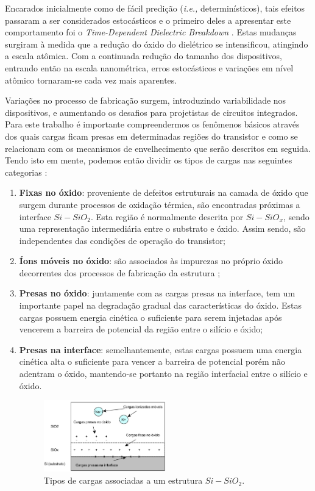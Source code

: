 Encarados inicialmente como de f\'{a}cil prediç\~{a}o (\textit{i.e.,} determinísticos), tais efeitos passaram a ser considerados estocásticos e o primeiro deles a apresentar este comportamento foi o \textit{Time-Dependent Dielectric Breakdown} \cite{Solomon1977}. Estas mudanças surgiram \`{a} medida que a reduç\~{a}o do \'{o}xido do diel\'{e}trico se intensificou, atingindo a escala atômica. Com a continuada redução do tamanho dos dispositivos, entrando então na escala nanométrica, erros estocásticos e variações em nível atômico tornaram-se cada vez mais aparentes.

Variaç\~{o}es no processo de fabricaç\~{a}o surgem, introduzindo variabilidade nos dispositivos, e aumentando os desafios para projetistas de circuitos integrados.
Para este trabalho é importante compreendermos os fenômenos básicos através dos quais cargas ficam presas em determinadas regiões do transistor e como se relacionam com os mecanismos de envelhecimento que serão descritos em seguida. Tendo isto em mente, podemos então dividir os tipos de cargas nas seguintes categorias \cite{Leblebici1993}:
\begin{enumerate}
\item\textbf{Fixas no óxido}: proveniente de defeitos estruturais na camada de óxido que surgem durante processos de oxidação térmica, são encontradas próximas a interface $Si-SiO_2$. Esta região é normalmente descrita por $Si-SiO_x$, sendo uma representação intermediária entre o substrato e óxido. Assim sendo, são independentes das condições de operação do transistor;\item\textbf{Íons móveis no óxido}: são associados às impurezas no próprio óxido decorrentes dos processos de fabricação da estrutura \cite{Bentarzi2011};\item\textbf{Presas no óxido}: juntamente com as cargas presas na interface, tem um importante papel na degradação gradual das características do óxido. Estas cargas possuem energia cinética o suficiente para serem injetadas após vencerem a barreira de potencial da região entre o silício e óxido;\item\textbf{Presas na interface}: semelhantemente, estas cargas possuem uma energia cinética alta o suficiente para vencer a barreira de potencial porém não adentram o óxido, mantendo-se portanto na região interfacial entre o silício e óxido.
\begin{figure}[H]
\center
\includegraphics[width=0.5\textwidth]{images/armadilhas_interfaciais}
\caption{Tipos de cargas associadas a um estrutura $Si-SiO_2$.}
\label{figure:armadilhas_interfaciais}
\end{figure}
\end{enumerate}
